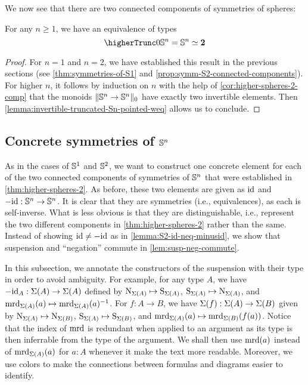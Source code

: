 \documentclass[english,a4paper]{lmcs}
\begin{document}
We now see that there are two connected components of symmetries of spheres:
\begin{thm} \label{thm:higher-spheres-2}
    For any $n \geq 1$, we have an equivalence of types
    \begin{equation}
    \higherTrunc 0 {\Sn n= \Sn n} \weq \bn 2
    \end{equation}
\end{thm}
\begin{proof}
  For $n = 1$ and $n=2$, we have established this result in the previous
  sections (see \cref{thm:symmetries-of-S1} and
  \cref{prop:symm-S2-connected-components}).  For higher $n$, it follows by
  induction on $n$ with the help of \cref{cor:higher-spheres-2-comp} that the
  monoids $\lVert{\mathbb S^{n}} \to {\mathbb S^{n}}\rVert_0$ have exactly two invertible elements.
  Then \cref{lemma:invertible-truncated-Sn-pointed-weq} allows us to conclude.
\end{proof}

\subsection{Concrete symmetries of \texorpdfstring{${\mathbb S^{n}}$}{Sn}}

As in the cases of ${{\mathbb S^{1}}}$ and ${{\mathbb S^{2}}}$, we want to construct one concrete element for each of the two connected components of symmetries of ${\mathbb S^{n}}$ that were established in \cref{thm:higher-spheres-2}.
As before, these two elements are given as $\mathord{\mathrm{id}}$ and $-\mathord{\mathrm{id}} : {\mathbb S^{n}} \to {\mathbb S^{n}}$.
It is clear that they are symmetries (i.e., equivalences), as each is self-inverse.
What is less obvious is that they are distinguishable, i.e., represent the two different components in \cref{thm:higher-spheres-2} rather than the same.
Instead of showing $\mathord{\mathrm{id}} \neq -\mathord{\mathrm{id}}$ as in \cref{lemma:S2-id-neq-minusid}, we show that suspension and ``negation'' commute in \cref{lem:susp-neg-commute}.

In this subsection, we annotate the constructors of the suspension with their type in order to avoid ambiguity.
For example, for any type $A$, we have $-\mathord{\mathrm{id}}_A : \operatorname{\Sigma}(A) \to \operatorname{\Sigma}(A)$ defined by
$\mathrm{N}_{\operatorname{\Sigma}(A)} \mapsto \mathrm{S}_{\operatorname{\Sigma}(A)}$,
$\mathrm{S}_{\operatorname{\Sigma}(A)} \mapsto \mathrm{N}_{\operatorname{\Sigma}(A)}$,
and $\operatorname{\mathrm{mrd}}_{\operatorname{\Sigma}(A)}(a) \mapsto \operatorname{\mathrm{mrd}}_{\operatorname{\Sigma}(A)}(a)^{-1}$.
For $f : A \to B$, we have $\operatorname{\Sigma}(f) : \operatorname{\Sigma}(A) \to \operatorname{\Sigma}(B)$ given by $\mathrm{N}_{\operatorname{\Sigma}(A)} \mapsto \mathrm{N}_{\operatorname{\Sigma}(B)}$,
$\mathrm{S}_{\operatorname{\Sigma}(A)} \mapsto \mathrm{S}_{\operatorname{\Sigma}(B)}$,
and $\operatorname{\mathrm{mrd}}_{\operatorname{\Sigma}(A)}(a) \mapsto \operatorname{\mathrm{mrd}}_{\operatorname{\Sigma}(B)}(f(a))$.
Notice that the index of $\operatorname{\mathrm{mrd}}$ is redundant when applied to an argument as its type is then inferrable from the type of the argument. We shall then use $\operatorname{\mathrm{mrd}}(a)$ instead of $\operatorname{\mathrm{mrd}}_{\operatorname{\Sigma}(A)}(a)$ for $a:A$ whenever it make the text more readable.
Moreover, we use colors to make the connections between formulas and diagrams easier to identify.
\end{document}
